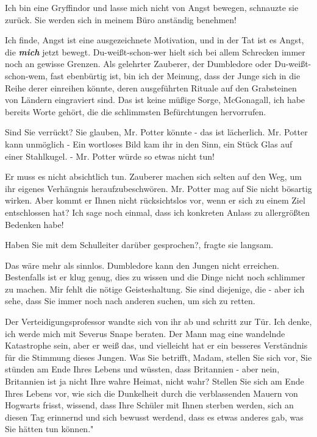 \glqq Ich bin eine Gryffindor und lasse mich nicht von Angst bewegen\grqq{},
schnauzte sie zurück. \glqq Sie werden sich in meinem Büro anständig
benehmen!\grqq{}

\glqq Ich finde, Angst ist eine ausgezeichnete Motivation, und in der Tat ist es
Angst, die \textbf{\emph{mich}} jetzt bewegt. Du-weißt-schon-wer hielt sich bei
allem Schrecken immer noch an gewisse Grenzen. Als gelehrter Zauberer, der
Dumbledore oder Du-weißt-schon-wem, fast ebenbürtig ist, bin ich der Meinung,
dass der Junge sich in die Reihe derer einreihen könnte, deren ausgeführten
Rituale auf den Grabsteinen von Ländern eingraviert sind. Das ist keine müßige
Sorge, McGonagall, ich habe bereits Worte gehört, die die schlimmsten
Befürchtungen hervorrufen.\grqq{}

\glqq Sind Sie verrückt? Sie glauben, Mr. Potter könnte - das ist lächerlich.
Mr. Potter kann unmöglich -\grqq{} Ein wortloses Bild kam ihr in den Sinn, ein
Stück Glas auf einer Stahlkugel. \glqq - Mr. Potter würde so etwas nicht
tun!\grqq{}

\glqq Er muss es nicht absichtlich tun. Zauberer machen sich selten auf den Weg,
um ihr eigenes Verhängnis heraufzubeschwören. Mr. Potter mag auf Sie nicht
bösartig wirken. Aber kommt er Ihnen nicht rücksichtslos vor, wenn er sich zu
einem Ziel entschlossen hat? Ich sage noch einmal, dass ich konkreten Anlass zu
allergrößten Bedenken habe!\grqq{}

\glqq Haben Sie mit dem Schulleiter darüber gesprochen?\grqq{}, fragte sie
langsam.

\glqq Das wäre mehr als sinnlos. Dumbledore kann den Jungen nicht erreichen.
Bestenfalls ist er klug genug, dies zu wissen und die Dinge nicht noch schlimmer
zu machen. Mir fehlt die nötige Geisteshaltung. Sie sind diejenige, die - aber
ich sehe, dass Sie immer noch nach anderen suchen, um sich zu retten.\grqq{}

Der Verteidigungsprofessor wandte sich von ihr ab und schritt zur Tür. \glqq Ich
denke, ich werde mich mit Severus Snape beraten. Der Mann mag eine wandelnde
Katastrophe sein, aber er weiß das, und vielleicht hat er ein besseres
Verständnis für die Stimmung dieses Jungen. Was Sie betrifft, Madam, stellen Sie
sich vor, Sie stünden am Ende Ihres Lebens und wüssten, dass Britannien - aber
nein, Britannien ist ja nicht Ihre wahre Heimat, nicht wahr? Stellen Sie sich am
Ende Ihres Lebens vor, wie sich die Dunkelheit durch die verblassenden Mauern
von Hogwarts frisst, wissend, dass Ihre Schüler mit Ihnen sterben werden, sich
an diesen Tag erinnernd und sich bewusst werdend, dass es etwas anderes gab, was
Sie hätten tun können."

